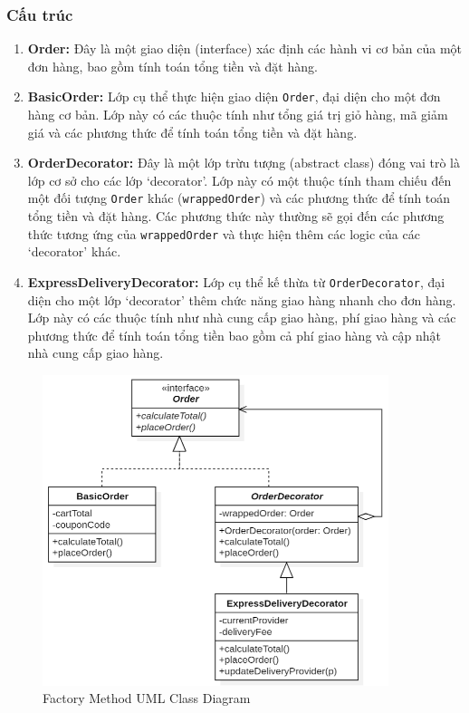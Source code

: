 \subsubsection{Cấu trúc}
\begin{flushleft}
    \begin{enumerate}
        \item \textbf{Order:} Đây là một giao diện (interface) xác định các hành vi cơ bản của một đơn hàng, bao gồm tính toán tổng tiền và đặt hàng.
        \item \textbf{BasicOrder:} Lớp cụ thể thực hiện giao diện \verb|Order|, đại diện cho một đơn hàng cơ bản. Lớp này có các thuộc tính như tổng giá trị giỏ hàng, mã giảm giá và các phương thức để tính toán tổng tiền và đặt hàng.
        \item \textbf{OrderDecorator:} Đây là một lớp trừu tượng (abstract class) đóng vai trò là lớp cơ sở cho các lớp `decorator'. Lớp này có một thuộc tính tham chiếu đến một đối tượng \verb|Order| khác (\verb|wrappedOrder|) và các phương thức để tính toán tổng tiền và đặt hàng. Các phương thức này thường sẽ gọi đến các phương thức tương ứng của \verb|wrappedOrder| và thực hiện thêm các logic của các `decorator' khác.
        \item \textbf{ExpressDeliveryDecorator:} Lớp cụ thể kế thừa từ \verb|OrderDecorator|, đại diện cho một lớp `decorator' thêm chức năng giao hàng nhanh cho đơn hàng. Lớp này có các thuộc tính như nhà cung cấp giao hàng, phí giao hàng và các phương thức để tính toán tổng tiền bao gồm cả phí giao hàng và cập nhật nhà cung cấp giao hàng.
    \end{enumerate}

    \begin{figure}[H]
        \centering
        \includegraphics[width=0.9\textwidth]{../assets/screenshots/uml/decorator.png}
        \caption{Factory Method UML Class Diagram}
    \end{figure}
\end{flushleft}

